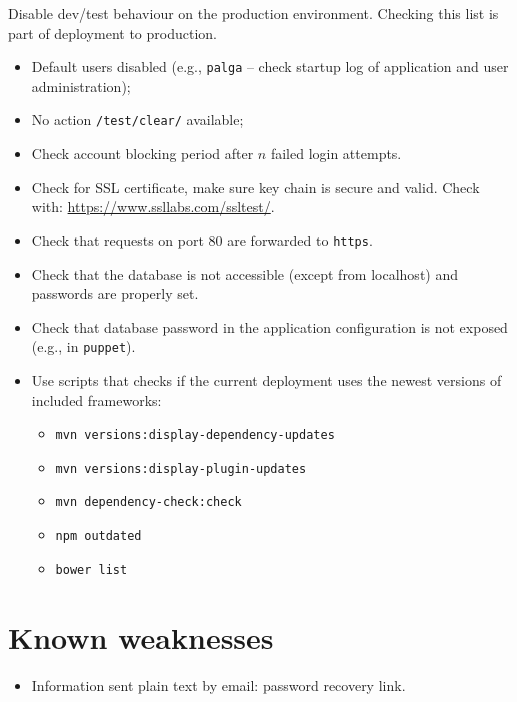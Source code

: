\documentclass[a4paper]{report}
\begin{document}
Disable dev/test behaviour on the production environment. 
Checking this list is part of deployment to production.
\begin{itemize}
\item Default users disabled (e.g., \texttt{palga} -- check startup log of application and user administration);
\item No action \texttt{/test/clear/} available;
\item Check account blocking period after $n$ failed login attempts.
\item Check for SSL certificate, make sure key chain is secure and valid. Check with: \url{https://www.ssllabs.com/ssltest/}.
\item Check that requests on port 80 are forwarded to \texttt{https}.
\item Check that the database is not accessible (except from localhost) and passwords are properly set.
\item Check that database password in the application configuration is not exposed (e.g., in \texttt{puppet}).
\item Use scripts that checks if the current deployment uses the
newest versions of included frameworks:
\begin{itemize}
  \item \texttt{mvn versions:display-dependency-updates}
  \item \texttt{mvn versions:display-plugin-updates}
  \item \texttt{mvn dependency-check:check}
  \item \texttt{npm outdated}
  \item \texttt{bower list}
\end{itemize}
\end{itemize}


\section{Known weaknesses}\label{section:knownproblems}

\begin{itemize}
\item Information sent plain text by email: password recovery link.
\end{itemize}



%

\end{document}
